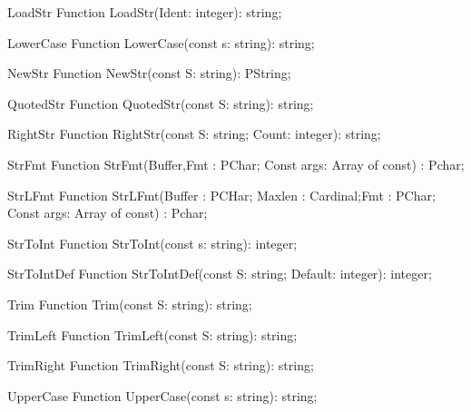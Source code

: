  
\begin{function}{LoadStr}
\Declaration
Function LoadStr(Ident: integer): string;
\Description
\Errors
\SeeAlso
\end{function}

 
\begin{function}{LowerCase}
\Declaration
Function LowerCase(const s: string): string;
\Description
\Errors
\SeeAlso
\end{function}

 
\begin{function}{NewStr}
\Declaration
Function NewStr(const S: string): PString;
\Description
\Errors
\SeeAlso
\end{function}

 
\begin{function}{QuotedStr}
\Declaration
Function QuotedStr(const S: string): string;
\Description
\Errors
\SeeAlso
\end{function}

 
\begin{function}{RightStr}
\Declaration
Function RightStr(const S: string; Count: integer): string;
\Description
\Errors
\SeeAlso
\end{function}

 
\begin{function}{StrFmt}
\Declaration
Function StrFmt(Buffer,Fmt : PChar; Const args: Array of const) : Pchar;
\Description
\Errors
\SeeAlso
\end{function}

 
\begin{function}{StrLFmt}
\Declaration
Function StrLFmt(Buffer : PCHar; Maxlen : Cardinal;Fmt : PChar; Const args: Array of const) : Pchar;
\Description
\Errors
\SeeAlso
\end{function}

 
\begin{function}{StrToInt}
\Declaration
Function StrToInt(const s: string): integer;
\Description
\Errors
\SeeAlso
\end{function}

 
\begin{function}{StrToIntDef}
\Declaration
Function StrToIntDef(const S: string; Default: integer): integer;
\Description
\Errors
\SeeAlso
\end{function}

 
\begin{function}{Trim}
\Declaration
Function Trim(const S: string): string;
\Description
\Errors
\SeeAlso
\end{function}

 
\begin{function}{TrimLeft}
\Declaration
Function TrimLeft(const S: string): string;
\Description
\Errors
\SeeAlso
\end{function}

 
\begin{function}{TrimRight}
\Declaration
Function TrimRight(const S: string): string;
\Description
\Errors
\SeeAlso
\end{function}

 
\begin{function}{UpperCase}
\Declaration
Function UpperCase(const s: string): string;
\Description
\Errors
\SeeAlso
\end{function}

 
